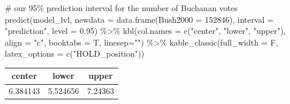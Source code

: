 \documentclass[
  letterpaper,
  DIV=11,
  numbers=noendperiod]{scrartcl}
\newenvironment{Shaded}{\begin{snugshade}}{\end{snugshade}}
\newcommand{\AttributeTok}[1]{\textcolor[rgb]{0.40,0.45,0.13}{#1}}
\newcommand{\CommentTok}[1]{\textcolor[rgb]{0.37,0.37,0.37}{#1}}
\newcommand{\DecValTok}[1]{\textcolor[rgb]{0.68,0.00,0.00}{#1}}
\newcommand{\FloatTok}[1]{\textcolor[rgb]{0.68,0.00,0.00}{#1}}
\newcommand{\FunctionTok}[1]{\textcolor[rgb]{0.28,0.35,0.67}{#1}}
\newcommand{\NormalTok}[1]{\textcolor[rgb]{0.00,0.23,0.31}{#1}}
\newcommand{\SpecialCharTok}[1]{\textcolor[rgb]{0.37,0.37,0.37}{#1}}
\newcommand{\StringTok}[1]{\textcolor[rgb]{0.13,0.47,0.30}{#1}}
\begin{document}
\begin{Shaded}
\begin{Highlighting}[]
\CommentTok{\# our 95\% prediction interval for the number of Buchanan votes}
\FunctionTok{predict}\NormalTok{(model\_lvl, }\AttributeTok{newdata =} \FunctionTok{data.frame}\NormalTok{(}\AttributeTok{Bush2000 =} \DecValTok{152846}\NormalTok{), }\AttributeTok{interval =} \StringTok{"prediction"}\NormalTok{, }\AttributeTok{level =} \FloatTok{0.95}\NormalTok{) }\SpecialCharTok{\%\textgreater{}\%}
  \FunctionTok{kbl}\NormalTok{(}\AttributeTok{col.names =} \FunctionTok{c}\NormalTok{(}\StringTok{"center"}\NormalTok{, }\StringTok{"lower"}\NormalTok{, }\StringTok{"upper"}\NormalTok{),}
      \AttributeTok{align =} \StringTok{"c"}\NormalTok{, }\AttributeTok{booktabs =}\NormalTok{ T, }\AttributeTok{linesep=}\StringTok{""}\NormalTok{) }\SpecialCharTok{\%\textgreater{}\%}
  \FunctionTok{kable\_classic}\NormalTok{(}\AttributeTok{full\_width =}\NormalTok{ F, }\AttributeTok{latex\_options =} \FunctionTok{c}\NormalTok{(}\StringTok{"HOLD\_position"}\NormalTok{))}
\end{Highlighting}
\end{Shaded}

\begin{table}[H]
\centering
\begin{tabular}[t]{ccc}
\toprule
center & lower & upper\\
\midrule
6.384143 & 5.524656 & 7.24363\\
\bottomrule
\end{tabular}
\end{table}
\end{document}

